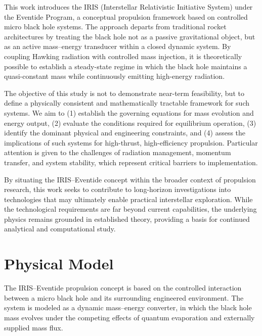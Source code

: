 \documentclass[conference]{IEEEtran}
\begin{document}
This work introduces the IRIS (Interstellar Relativistic Initiative System) under the Eventide Program, a conceptual propulsion framework based on controlled micro black hole systems. The approach departs from traditional rocket architectures by treating the black hole not as a passive gravitational object, but as an active mass–energy transducer within a closed dynamic system. By coupling Hawking radiation with controlled mass injection, it is theoretically possible to establish a steady-state regime in which the black hole maintains a quasi-constant mass while continuously emitting high-energy radiation.

The objective of this study is not to demonstrate near-term feasibility, but to define a physically consistent and mathematically tractable framework for such systems. We aim to (1) establish the governing equations for mass evolution and energy output, (2) evaluate the conditions required for equilibrium operation, (3) identify the dominant physical and engineering constraints, and (4) assess the implications of such systems for high-thrust, high-efficiency propulsion. Particular attention is given to the challenges of radiation management, momentum transfer, and system stability, which represent critical barriers to implementation.

By situating the IRIS–Eventide concept within the broader context of propulsion research, this work seeks to contribute to long-horizon investigations into technologies that may ultimately enable practical interstellar exploration. While the technological requirements are far beyond current capabilities, the underlying physics remains grounded in established theory, providing a basis for continued analytical and computational study.

\section{Physical Model}

The IRIS–Eventide propulsion concept is based on the controlled interaction between a micro black hole and its surrounding engineered environment. The system is modeled as a dynamic mass–energy converter, in which the black hole mass evolves under the competing effects of quantum evaporation and externally supplied mass flux.
\end{document}
